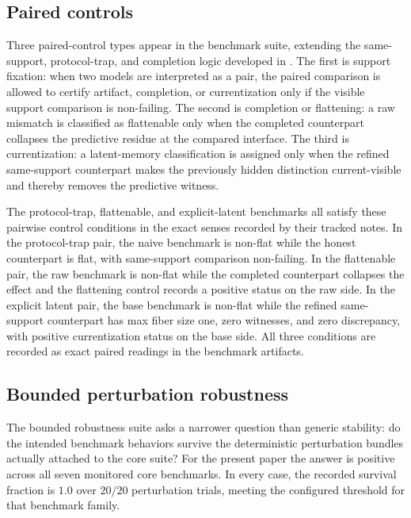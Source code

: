 \documentclass[11pt]{article}
\theoremstyle{definition}
\begin{document}
\subsection{Paired controls}\label{subsec:controls-pairs}
Three paired-control types appear in the benchmark suite, extending the same-support, protocol-trap, and completion logic developed in \citep{Tsiokos2026EventPackages,Tsiokos2026ProtocolTrap,Tsiokos2026FlattenStone}. The first is support fixation: when two models are interpreted as a pair, the paired comparison is allowed to certify artifact, completion, or currentization only if the visible support comparison is non-failing. The second is completion or flattening: a raw mismatch is classified as flattenable only when the completed counterpart collapses the predictive residue at the compared interface. The third is currentization: a latent-memory classification is assigned only when the refined same-support counterpart makes the previously hidden distinction current-visible and thereby removes the predictive witness.

The protocol-trap, flattenable, and explicit-latent benchmarks all satisfy these pairwise control conditions in the exact senses recorded by their tracked notes. In the protocol-trap pair, the naive benchmark is non-flat while the honest counterpart is flat, with same-support comparison non-failing. In the flattenable pair, the raw benchmark is non-flat while the completed counterpart collapses the effect and the flattening control records a positive status on the raw side. In the explicit latent pair, the base benchmark is non-flat while the refined same-support counterpart has max fiber size one, zero witnesses, and zero discrepancy, with positive currentization status on the base side. All three conditions are recorded as exact paired readings in the benchmark artifacts.

\subsection{Bounded perturbation robustness}\label{subsec:controls-robustness}
The bounded robustness suite asks a narrower question than generic stability: do the intended benchmark behaviors survive the deterministic perturbation bundles actually attached to the core suite? For the present paper the answer is positive across all seven monitored core benchmarks. In every case, the recorded survival fraction is $1.0$ over $20/20$ perturbation trials, meeting the configured threshold for that benchmark family.
\end{document}
